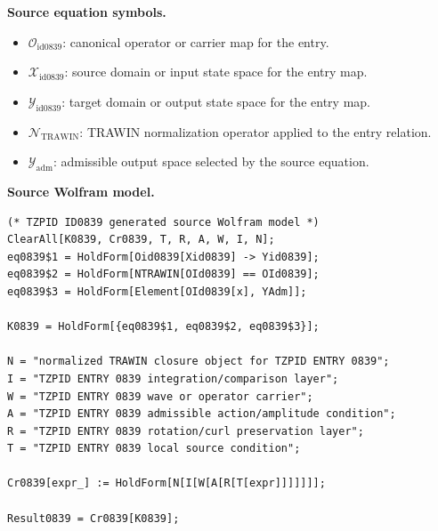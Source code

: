 \begin{minipage}[t]{0.49\linewidth}
\begingroup
\small
\raggedright
\textbf{Source equation symbols.}\par
\begin{itemize}[leftmargin=1.35em,itemsep=1pt,topsep=1pt,parsep=0pt]
    \item $\mathcal{O}_{\mathrm{id0839}}$: canonical operator or carrier map for the entry.
    \item $\mathcal{X}_{\mathrm{id0839}}$: source domain or input state space for the entry map.
    \item $\mathcal{Y}_{\mathrm{id0839}}$: target domain or output state space for the entry map.
    \item $\mathcal{N}_{\mathrm{TRAWIN}}$: TRAWIN normalization operator applied to the entry relation.
    \item $\mathcal{Y}_{\mathrm{adm}}$: admissible output space selected by the source equation.
\end{itemize}
\endgroup
\end{minipage}\hfill
\begin{minipage}[t]{0.47\linewidth}
\begingroup
\scriptsize
\raggedright
\textbf{Source Wolfram model.}\par
\begin{Verbatim}[fontsize=\tiny,breaklines=true,breakanywhere=true]
(* TZPID ID0839 generated source Wolfram model *)
ClearAll[K0839, Cr0839, T, R, A, W, I, N];
eq0839$1 = HoldForm[Oid0839[Xid0839] -> Yid0839];
eq0839$2 = HoldForm[NTRAWIN[OId0839] == OId0839];
eq0839$3 = HoldForm[Element[OId0839[x], YAdm]];

K0839 = HoldForm[{eq0839$1, eq0839$2, eq0839$3}];

N = "normalized TRAWIN closure object for TZPID ENTRY 0839";
I = "TZPID ENTRY 0839 integration/comparison layer";
W = "TZPID ENTRY 0839 wave or operator carrier";
A = "TZPID ENTRY 0839 admissible action/amplitude condition";
R = "TZPID ENTRY 0839 rotation/curl preservation layer";
T = "TZPID ENTRY 0839 local source condition";

Cr0839[expr_] := HoldForm[N[I[W[A[R[T[expr]]]]]]];

Result0839 = Cr0839[K0839];
\end{Verbatim}
\endgroup
\end{minipage}


